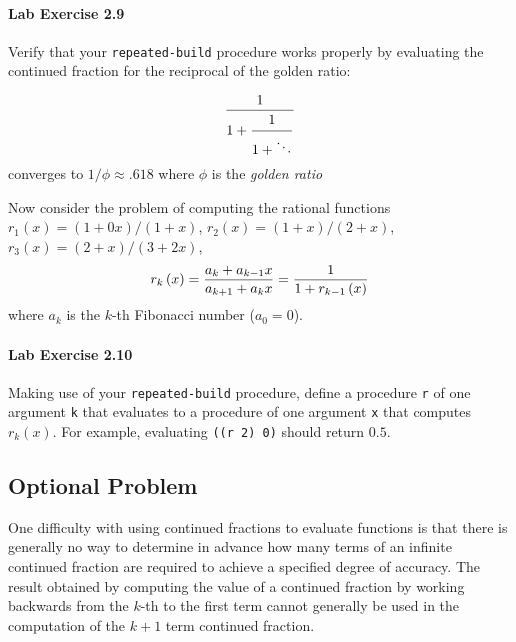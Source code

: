 \paragraph{ Lab Exercise 2.9 }
Verify that your {\tt repeated-build} procedure works properly by evaluating
the continued fraction for the reciprocal of the golden ratio:

\begin{displaymath}
{1 \over {\displaystyle 1 +
        {\strut 1 \over {\displaystyle 1 + \ddots } }}}
\end{displaymath}
converges to $1/\phi\approx .618$ where $\phi$ is the {\em golden ratio}

Now consider the problem of computing the rational functions
$r_1(x)=(1+0x)/(1+x)$, $r_2(x)=(1+x)/(2+x)$, $r_3(x)=(2+x)/(3+2x)$,
\begin{displaymath}
r_k\left( x \right)={{a_k+a_{k-1}x} \over {a_{k+1}+a_kx}}={1 \over
{1+r_{k-1}\left( x \right)}}
\end{displaymath}
where $a_k$ is the $k$-th Fibonacci number ($a_0=0$).

\paragraph{ Lab Exercise 2.10 }
Making  use of your {\tt repeated-build} procedure, define a procedure
{\tt r} of one argument {\tt k} that evaluates to a procedure of
one argument {\tt x} that computes $r_k(x)$. For example,
evaluating {\tt ((r 2) 0)} should return $0.5$.

\subsection{Optional Problem}

One difficulty with using continued fractions to evaluate functions
is that there is generally no way to determine in advance how many
terms of an infinite continued fraction are required to achieve a
specified degree of accuracy. The result obtained by computing the
value of a continued fraction by working backwards from the $k$-th to
the first term cannot generally be used in the computation of the
$k+1$ term continued fraction.

